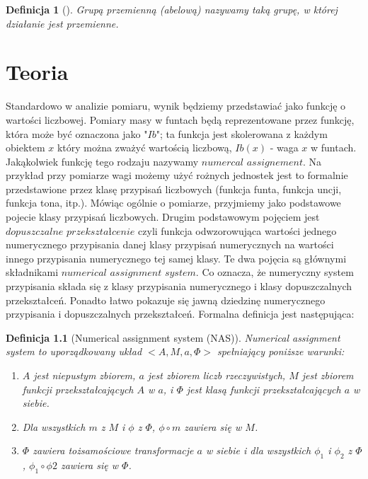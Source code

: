 \documentclass[12pt,a4paper]{report}
\newtheorem{definition}{Definicja}
\begin{document}
\begin{definition}[\citep{jedrzejewski2011algebra}]
Grupą przemienną (abelową) nazywamy taką grupę, w której działanie jest przemienne.
\end{definition}



\chapter{Teoria}

Standardowo w analizie pomiaru, wynik będziemy przedstawiać jako funkcję o wartości liczbowej. Pomiary masy w funtach będą reprezentowane przez funkcję, która może być oznaczona jako "$Ib$";  ta funkcja jest skolerowana z każdym obiektem $x$ który można zważyć wartością liczbową, $Ib(x)$ - waga $x$ w funtach. Jakąkolwiek funkcję tego rodzaju nazywamy $numercal$ $assignement$. Na przykład przy pomiarze wagi możemy użyć rożnych jednostek jest to formalnie przedstawione  przez klasę przypisań liczbowych (funkcja funta, funkcja uncji, funkcja tona, itp.). Mówiąc ogólnie o pomiarze, przyjmiemy jako podstawowe pojecie klasy przypisań liczbowych. Drugim podstawowym pojęciem jest $dopuszczalne$ $przekształcenie$ czyli funkcja odwzorowująca wartości jednego numerycznego przypisania danej klasy przypisań numerycznych na wartości innego przypisania numerycznego tej samej klasy. Te dwa pojęcia są głównymi składnikami $numerical$ $assignment$ $system$. Co oznacza, że numeryczny system przypisania składa się z klasy przypisania numerycznego i klasy dopuszczalnych przekształceń. Ponadto łatwo pokazuje się jawną dziedzinę numerycznego przypisania i dopuszczalnych przekształceń. Formalna definicja jest następująca:
\begin{definition}[Numerical assignment system (NAS)]
Numerical assignment system to uporządkowany układ $<A, M, a, \Phi>$ spełniający poniższe warunki:
\begin{enumerate}
\item
$A$ jest niepustym zbiorem, $a$ jest zbiorem liczb rzeczywistych, $M$ jest zbiorem funkcji przekształcających $A$ w $a$, i $\Phi$ jest klasą funkcji przekształcających $a$ w siebie.  
\item
Dla wszystkich $m$ z $M$ i $\phi$ z $\Phi$, $\phi \circ m$ zawiera się w $M$. 
\item
$\Phi$ zawiera tożsamościowe transformacje $a$ w siebie i dla wszystkich $\phi_{1}$ i $\phi_{2}$ z $\Phi$, $\phi_{1} \circ \phi{2}$ zawiera się w $\Phi$.

\end{enumerate}

\end{definition}
\end{document}
